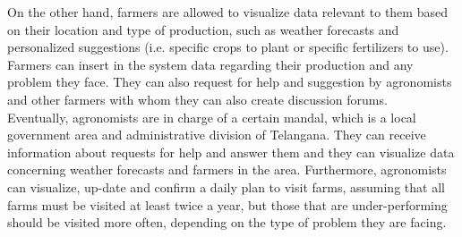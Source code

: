 On the other hand, farmers are allowed to visualize data relevant to them based on their location and type of production, such as weather forecasts and personalized suggestions (i.e. specific crops to plant or specific fertilizers to use). Farmers can insert in the system data regarding their production and any problem they face. They can also request for help and suggestion by agronomists and other farmers with whom they can also create discussion forums.\\

Eventually, agronomists are in charge of a certain mandal, which is a local government area and administrative division of Telangana. They can receive information about requests for help and answer them and they can visualize data concerning weather forecasts and farmers in the area. Furthermore, agronomists can visualize, up-date and confirm a daily plan to visit farms, assuming that all farms must be visited at least twice a year, but those that are under-performing should be visited more often, depending on the type of problem they are facing.

